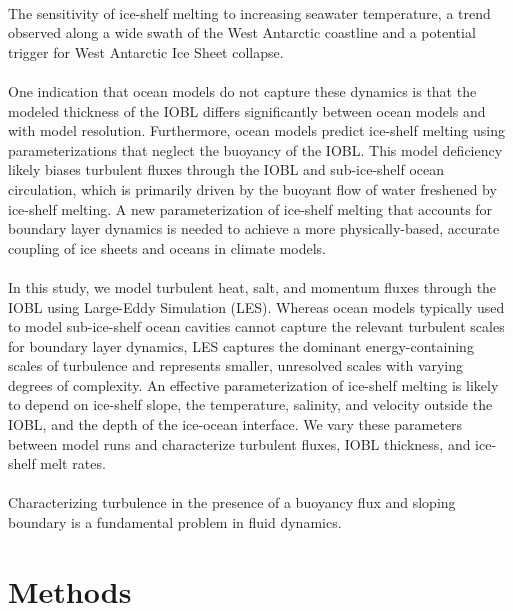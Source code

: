 \documentclass[draft]{styles/agujournal2019}
\begin{document}
\paragraph{}
The sensitivity of ice-shelf melting to increasing seawater temperature, a trend observed along a wide swath of the West Antarctic coastline and a potential trigger for West Antarctic Ice Sheet collapse. 

\paragraph{}
One indication that ocean models do not capture these dynamics is that the modeled thickness of the IOBL differs significantly between ocean models and with model resolution. Furthermore, ocean models predict ice-shelf melting using parameterizations that neglect the buoyancy of the IOBL. This model deficiency likely biases turbulent fluxes through the IOBL and sub-ice-shelf ocean circulation, which is primarily driven by the buoyant flow of water freshened by ice-shelf melting. A new parameterization of ice-shelf melting that accounts for boundary layer dynamics is needed to achieve a more physically-based, accurate coupling of ice sheets and oceans in climate models.

\paragraph{}
In this study, we model turbulent heat, salt, and momentum fluxes through the IOBL using Large-Eddy Simulation (LES). Whereas ocean models typically used to model sub-ice-shelf ocean cavities cannot capture the relevant turbulent scales for boundary layer dynamics, LES captures the dominant energy-containing scales of turbulence and represents smaller, unresolved scales with varying degrees of complexity. An effective parameterization of ice-shelf melting is likely to depend on ice-shelf slope, the temperature, salinity, and velocity outside the IOBL, and the depth of the ice-ocean interface. We vary these parameters between model runs and characterize turbulent fluxes, IOBL thickness, and ice-shelf melt rates.  

\paragraph{}
Characterizing turbulence in the presence of a buoyancy flux and sloping boundary is a fundamental problem in fluid dynamics. 

\section{Methods}
\end{document}
